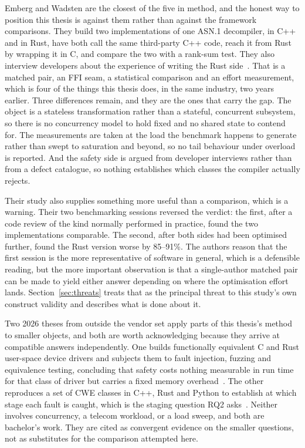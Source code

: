 \documentclass[english,twoside,openright,a4paper,censored,csm,software-track-2020]{HYthesisML}
\begin{document}
Emberg and Wadsten are the closest of the five in method, and the honest way to position this
thesis is against them rather than against the framework comparisons. They build two
implementations of one ASN.1 decompiler, in C++ and in Rust, have both call the same third-party
C++ code, reach it from Rust by wrapping it in C, and compare the two with a rank-sum test. They
also interview developers about the experience of writing the Rust side~\cite{emberg2023asn1}.
That is a matched pair, an FFI seam, a statistical comparison and an effort measurement, which is
four of the things this thesis does, in the same industry, two years earlier. Three differences
remain, and they are the ones that carry the gap. The object is a stateless transformation rather
than a stateful, concurrent subsystem, so there is no concurrency model to hold fixed and no
shared state to contend for. The measurements are taken at the load the benchmark happens to
generate rather than swept to saturation and beyond, so no tail behaviour under overload is
reported. And the safety side is argued from developer interviews rather than from a defect
catalogue, so nothing establishes which classes the compiler actually rejects.

Their study also supplies something more useful than a comparison, which is a warning.
Their two benchmarking sessions reversed the verdict: the first, after a code review of the kind
normally performed in practice, found the two implementations comparable. The second, after both
sides had been optimised further, found the Rust version worse by 85--91\%. The authors reason
that the first session is the more representative of software in general, which is a defensible
reading, but the more important observation is that a single-author matched pair can be made to
yield either answer depending on where the optimisation effort lands.
Section~\ref{sec:threats} treats that as the principal threat to this study's own construct
validity and describes what is done about it.

Two 2026 theses from outside the vendor set apply parts of this thesis's method to smaller
objects, and both are worth acknowledging because they arrive at compatible answers
independently. One builds functionally equivalent C and Rust user-space device drivers and
subjects them to fault injection, fuzzing and equivalence testing, concluding that safety costs
nothing measurable in run time for that class of driver but carries a fixed memory
overhead~\cite{sundvisson2026drivers}. The other reproduces a set of CWE classes in C++, Rust and
Python to establish at which stage each fault is caught, which is the staging question RQ2
asks~\cite{andersson2026stdmemsafety}. Neither involves concurrency, a telecom workload, or a load
sweep, and both are bachelor's work. They are cited as convergent evidence on the smaller
questions, not as substitutes for the comparison attempted here.
\end{document}
